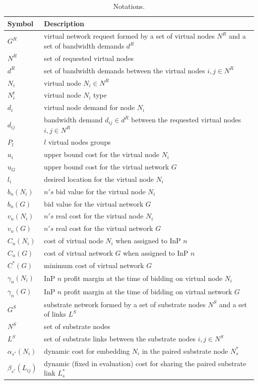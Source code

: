 \begin{table}[htbp]
	\myfloatalign \footnotesize
	\begin{tabular}{m{2cm} m{14cm}}
		\textbf{Symbol} & \textbf{Description}\\ 
		\hline
		$G^{R}$ & virtual network request formed by a set of virtual nodes $N^{R}$ and a set of bandwidth demands $d^{R}$  \\		$N^{R}$ & set of requested virtual nodes \\
		$d^{R}$ & set of bandwidth demands between the virtual nodes $i,j \in N^{R}$ \\
		$N_i$ & virtual node $N_i \in N^{R}$ \\
		$N^{t}_i$ & virtual node $N_i$ type \\
		$d_i$ & virtual node demand for node $N_i$ \\
		$d_{ij}$ & bandwidth demand $d_{ij} \in d^{R}$ between the requested virtual nodes $i,j \in N^{R}$ \\
		$P_l$ &  $l$ virtual nodes groups \\
		$u_{i}$ & upper bound cost for the virtual node $N_i$ \\
		$u_{G}$ & upper bound cost for the virtual network $G$ \\
		$l_{i}$ & desired location for the virtual node $N_i$ \\
		$b_n(N_i)$ & $n's$ bid value for the virtual node $N_i$ \\
		$b_n(G)$ & bid value for the virtual network $G$ \\
		$v_n(N_i)$ & $n's$ real cost for the virtual node $N_i$ \\
		$v_n(G)$ & $n's$ real cost for the virtual network $G$ \\
		$C_n(N_i)$ & cost of virtual node $N_i$ when assigned to InP $n$ \\
		$C_n(G)$ & cost of virtual network $G$ when assigned to InP $n$ \\
		$C^{*}(G)$ & minimum cost of virtual network $G$ \\
		$\gamma_n(N_i)$ & InP $n$ profit margin at the time of bidding on virtual node $N_i$ \\
		$\gamma_n(G)$ & InP $n$ profit margin at the time of bidding on virtual network $G$\\
		$G^{S}$ & substrate network formed by a set of substrate nodes $N^{S}$ and a set of links $L^{S}$\\
		$N^{S}$ & set of substrate nodes \\
		$L^{S}$ & set of substrate links between the substrate nodes $i,j \in N^{S}$ \\
		$\alpha_{s^{*}}(N_i)$ & dynamic cost for embedding $N_i$ in the paired substrate node $N_s^{*}$ \\
		$\beta_{s^{*}}(L_{ij})$ & dynamic (fixed in evaluation) cost for sharing the paired substrate link $L_s^{*}$ \\
		\hline
	\end{tabular}
	\caption{Notations.}
	\label{tab:notations}
\end{table}


